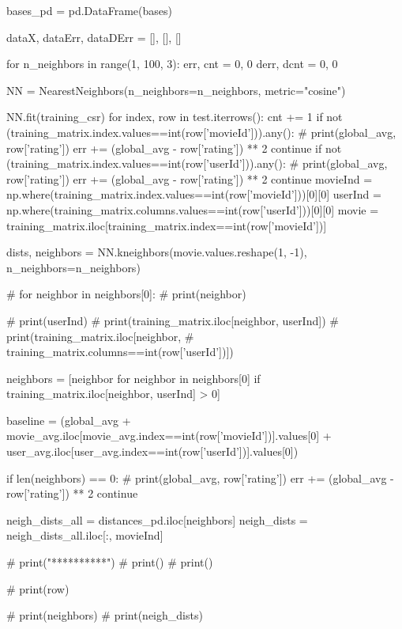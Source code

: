 \begin{latin}
\begin{python}
bases_pd = pd.DataFrame(bases)


dataX, dataErr, dataDErr = [], [], []

for n_neighbors in range(1, 100, 3):
    err, cnt = 0, 0
    derr, dcnt = 0, 0

    NN = NearestNeighbors(n_neighbors=n_neighbors, metric="cosine")

    NN.fit(training_csr)
    for index, row in test.iterrows():
        cnt += 1
        if not (training_matrix.index.values==int(row['movieId'])).any():
            #  print(global_avg, row['rating'])
            err += (global_avg - row['rating']) ** 2
            continue
        if not (training_matrix.index.values==int(row['userId'])).any():
            #  print(global_avg, row['rating'])
            err += (global_avg - row['rating']) ** 2
            continue
        movieInd = np.where(training_matrix.index.values==int(row['movieId']))[0][0]
        userInd = np.where(training_matrix.columns.values==int(row['userId']))[0][0]
        movie = training_matrix.iloc[training_matrix.index==int(row['movieId'])]

        dists, neighbors = NN.kneighbors(movie.values.reshape(1, -1), n_neighbors=n_neighbors)


        #  for neighbor in neighbors[0]:
        #      print(neighbor)

        #      print(userInd)
        #      print(training_matrix.iloc[neighbor, userInd])
        #      print(training_matrix.iloc[neighbor,
        #              training_matrix.columns==int(row['userId'])])

        neighbors = [neighbor for neighbor in neighbors[0] if
                training_matrix.iloc[neighbor, userInd] > 0]

        baseline = (global_avg +
                movie_avg.iloc[movie_avg.index==int(row['movieId'])].values[0] +
                user_avg.iloc[user_avg.index==int(row['userId'])].values[0])


        if len(neighbors) == 0:
            #  print(global_avg, row['rating'])
            err += (global_avg - row['rating']) ** 2
            continue


        neigh_dists_all = distances_pd.iloc[neighbors]
        neigh_dists = neigh_dists_all.iloc[:, movieInd]

        #  print("**********")
        #  print()
        #  print()

        #  print(row)

        #  print(neighbors)
        #  print(neigh_dists)


\end{python}
\end{latin}
